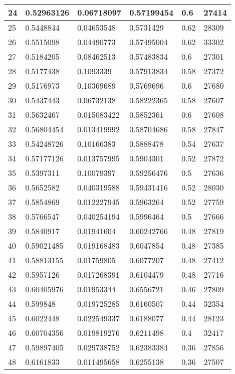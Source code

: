 \begin{longtable}{|l|l|l|l|l|l|}
24 & 0.52963126 & 0.06718097 & 0.57199454 & 0.6 & 27414 \\ \hline 
25 & 0.5448844 & 0.04653548 & 0.5731429 & 0.62 & 28309 \\ \hline 
26 & 0.5515098 & 0.04490773 & 0.57495004 & 0.62 & 33302 \\ \hline 
27 & 0.5184205 & 0.08462513 & 0.57483834 & 0.6 & 27301 \\ \hline 
28 & 0.5177438 & 0.1093339 & 0.57913834 & 0.58 & 27372 \\ \hline 
29 & 0.5176973 & 0.10369689 & 0.5769696 & 0.6 & 27680 \\ \hline 
30 & 0.5437443 & 0.06732138 & 0.58222365 & 0.58 & 27607 \\ \hline 
31 & 0.5632467 & 0.015083422 & 0.5852361 & 0.6 & 27608 \\ \hline 
32 & 0.56804454 & 0.013419992 & 0.58704686 & 0.58 & 27847 \\ \hline 
33 & 0.54248726 & 0.10166383 & 0.5888478 & 0.54 & 27637 \\ \hline 
34 & 0.57177126 & 0.013757995 & 0.5904301 & 0.52 & 27872 \\ \hline 
35 & 0.5397311 & 0.10079397 & 0.59256476 & 0.5 & 27636 \\ \hline 
36 & 0.5652582 & 0.040319588 & 0.59431416 & 0.52 & 28030 \\ \hline 
37 & 0.5854869 & 0.012227945 & 0.5963264 & 0.52 & 27759 \\ \hline 
38 & 0.5766547 & 0.040254194 & 0.5996464 & 0.5 & 27666 \\ \hline 
39 & 0.5840917 & 0.01941604 & 0.60242766 & 0.48 & 27819 \\ \hline 
40 & 0.59021485 & 0.019168483 & 0.6047854 & 0.48 & 27385 \\ \hline 
41 & 0.58813155 & 0.01759805 & 0.6077207 & 0.48 & 27412 \\ \hline 
42 & 0.5957126 & 0.017268391 & 0.6104479 & 0.48 & 27716 \\ \hline 
43 & 0.60405976 & 0.01953344 & 0.6556721 & 0.46 & 27809 \\ \hline 
44 & 0.599848 & 0.019725285 & 0.6160507 & 0.44 & 32354 \\ \hline 
45 & 0.6022448 & 0.022549337 & 0.6188077 & 0.44 & 28123 \\ \hline 
46 & 0.60704356 & 0.019819276 & 0.6211498 & 0.4 & 32417 \\ \hline 
47 & 0.59897405 & 0.029738752 & 0.62383384 & 0.36 & 27856 \\ \hline 
48 & 0.6161833 & 0.011495658 & 0.6255138 & 0.36 & 27507 \\ \hline 

\end{longtable}
